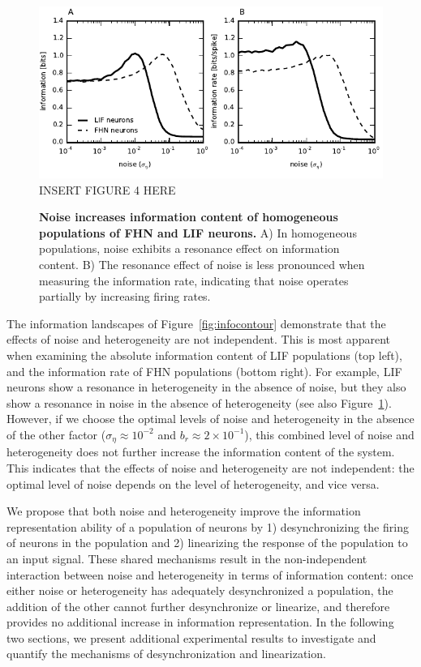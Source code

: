 \documentclass[letterpaper,11pt]{article}
\begin{document}
\begin{figure}
  \ifx\hidefigures\undefined
    \centering
    \includegraphics[width=\textwidth]{figure4_infonoise.pdf}
  \else
    INSERT FIGURE 4 HERE
  \fi
  \caption{
    \textbf{Noise increases information content of homogeneous populations of FHN and LIF neurons.} A) In homogeneous populations, noise exhibits a resonance effect on information content. B) The resonance effect of noise is less pronounced when measuring the information rate, indicating that noise operates partially by increasing firing rates.
  }
  \label{fig:infonoise}
\end{figure}

The information landscapes of Figure~\ref{fig:infocontour} demonstrate that the effects of noise and heterogeneity are not independent. This is most apparent when examining the absolute information content of LIF populations (top left), and the information rate of FHN populations (bottom right).
For example, LIF neurons show a resonance in heterogeneity in the absence of noise,
but they also show a resonance in noise in the absence of heterogeneity (see also Figure~\ref{fig:infonoise}).
However, if we choose the optimal levels of noise and heterogeneity in the absence of the other factor ($\sigma_\eta \approx 10^{-2}$ and $b_r \approx 2 \times 10^{-1}$), this combined level of noise and heterogeneity does not further increase the information content of the system. This indicates that the effects of noise and heterogeneity are not independent: the optimal level of noise depends on the level of heterogeneity, and vice versa.

We propose that both noise and heterogeneity improve the information representation ability of a population of neurons by 1) desynchronizing the firing of neurons in the population and 2) linearizing the response of the population to an input signal. These shared mechanisms result in the non-independent interaction between noise and heterogeneity in terms of information content: once either noise or heterogeneity has adequately desynchronized a population, the addition of the other cannot further desynchronize or linearize, and therefore provides no additional increase in information representation. In the following two sections, we present additional experimental results to investigate and quantify the mechanisms of desynchronization and linearization.
\end{document}
